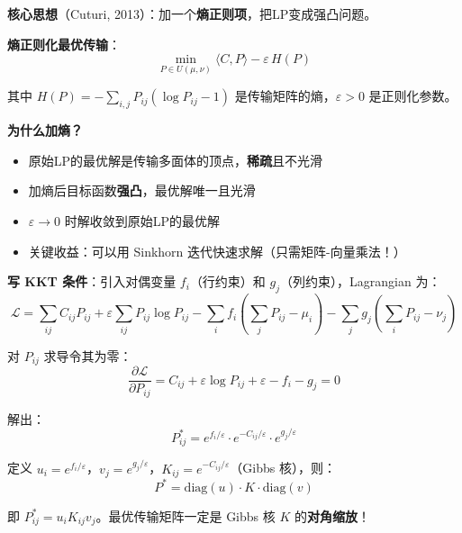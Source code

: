 \documentclass[12pt, a4paper]{ctexart}
\begin{document}
\begin{blackboard}

\textbf{核心思想}（Cuturi, 2013）：加一个\textbf{熵正则项}，把LP变成强凸问题。

\textbf{熵正则化最优传输}：
\[
\min_{P \in U(\mu, \nu)} \langle C, P \rangle - \varepsilon \, H(P)
\]

其中 $H(P) = -\sum_{i,j} P_{ij} (\log P_{ij} - 1)$ 是传输矩阵的熵，$\varepsilon > 0$ 是正则化参数。

\textbf{为什么加熵？}
\begin{itemize}
    \item 原始LP的最优解是传输多面体的顶点，\textbf{稀疏}且不光滑
    \item 加熵后目标函数\textbf{强凸}，最优解唯一且光滑
    \item $\varepsilon \to 0$ 时解收敛到原始LP的最优解
    \item 关键收益：可以用 Sinkhorn 迭代快速求解（只需矩阵-向量乘法！）
\end{itemize}

\end{blackboard}

\begin{blackboard}[熵正则化的最优解结构]

\textbf{写 KKT 条件}：引入对偶变量 $f_i$（行约束）和 $g_j$（列约束），Lagrangian 为：
\[
\mathcal{L} = \sum_{ij} C_{ij} P_{ij} + \varepsilon \sum_{ij} P_{ij} \log P_{ij} - \sum_i f_i \left(\sum_j P_{ij} - \mu_i\right) - \sum_j g_j \left(\sum_i P_{ij} - \nu_j\right)
\]

对 $P_{ij}$ 求导令其为零：
\[
\frac{\partial \mathcal{L}}{\partial P_{ij}} = C_{ij} + \varepsilon \log P_{ij} + \varepsilon - f_i - g_j = 0
\]

解出：
\[
P_{ij}^* = e^{f_i/\varepsilon} \cdot e^{-C_{ij}/\varepsilon} \cdot e^{g_j/\varepsilon}
\]

定义 $u_i = e^{f_i/\varepsilon}$，$v_j = e^{g_j/\varepsilon}$，$K_{ij} = e^{-C_{ij}/\varepsilon}$（Gibbs 核），则：
\[
\boxed{P^* = \text{diag}(u) \cdot K \cdot \text{diag}(v)}
\]

即 $P^*_{ij} = u_i K_{ij} v_j$。最优传输矩阵一定是 Gibbs 核 $K$ 的\textbf{对角缩放}！

\end{blackboard}
\end{document}

